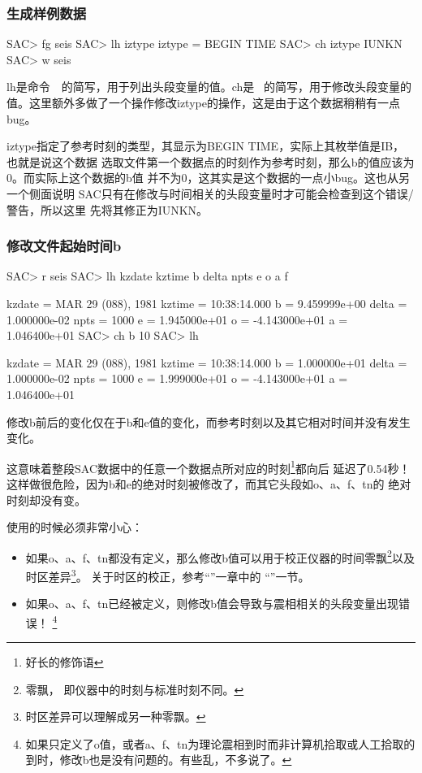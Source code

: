 \subsubsection{生成样例数据}
\begin{SACCode}
SAC> fg seis
SAC> lh iztype
    iztype = BEGIN TIME
SAC> ch iztype IUNKN
SAC> w seis
\end{SACCode}
lh是命令~~的简写，用于列出头段变量的值。ch是~
的简写，用于修改头段变量的值。这里额外多做了一个操作修改iztype的操作，这是由于这个数据稍稍有一点bug。

iztype指定了参考时刻的类型，其显示为BEGIN TIME，实际上其枚举值是IB，也就是说这个数据
选取文件第一个数据点的时刻作为参考时刻，那么b的值应该为0。而实际上这个数据的b值
并不为0，这其实是这个数据的一点小bug。这也从另一个侧面说明
SAC只有在修改与时间相关的头段变量时才可能会检查到这个错误/警告，所以这里
先将其修正为IUNKN。

\subsubsection{修改文件起始时间b}
\begin{SACCode}
SAC> r seis
SAC> lh kzdate kztime b delta npts e o a f

     kzdate = MAR 29 (088), 1981
     kztime = 10:38:14.000
          b = 9.459999e+00
      delta = 1.000000e-02
       npts = 1000
          e = 1.945000e+01
          o = -4.143000e+01
          a = 1.046400e+01
SAC> ch b 10
SAC> lh

     kzdate = MAR 29 (088), 1981
     kztime = 10:38:14.000
          b = 1.000000e+01
      delta = 1.000000e-02
       npts = 1000
          e = 1.999000e+01
          o = -4.143000e+01
          a = 1.046400e+01
\end{SACCode}

修改b前后的变化仅在于b和e值的变化，而参考时刻以及其它相对时间并没有发生变化。

这意味着整段SAC数据中的任意一个数据点所对应的时刻\footnote{好长的修饰语}都向后
延迟了0.54秒！这样做很危险，因为b和e的绝对时刻被修改了，而其它头段如o、a、f、tn的
绝对时刻却没有变。

使用的时候必须非常小心：
\begin{itemize}
\item 如果o、a、f、tn都没有定义，那么修改b值可以用于校正仪器的时间零飘\footnote{零飘，
    即仪器中的时刻与标准时刻不同。}以及时区差异\footnote{时区差异可以理解成另一种零飘。}。
    关于时区的校正，参考``''一章中的
    ``''一节。
\item 如果o、a、f、tn已经被定义，则修改b值会导致与震相相关的头段变量出现错误！
    \footnote{如果只定义了o值，或者a、f、tn为理论震相到时而非计算机拾取或人工拾取的
    到时，修改b也是没有问题的。有些乱，不多说了。}
\end{itemize}

